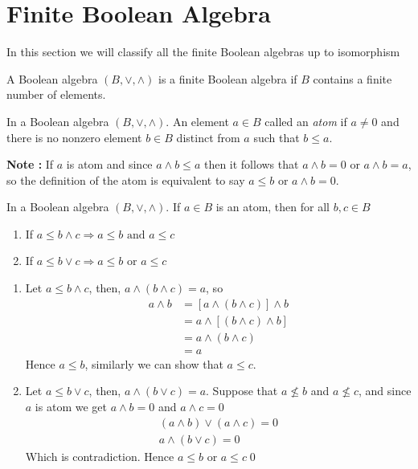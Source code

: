 \section{Finite Boolean Algebra}
In this section we will classify all the finite Boolean algebras up to isomorphism

\begin{mydef}
    A Boolean algebra \((B,\vee,\wedge)\) is a finite Boolean algebra if \(B\) contains a finite number of elements.
\end{mydef}

\begin{mydef}
    In a Boolean algebra \((B,\vee,\wedge)\). An element \(a\in B\) called an \textit{atom} if \(a\neq0\) and there is no nonzero element \(b\in B\) distinct from \(a\) such that \(b\leq a\).
\end{mydef}

\noindent
\textbf{Note : }If \(a\) is atom and since \(a\wedge b\leq a\) then it follows that \(a\wedge b=0\) or \(a\wedge b=a\), so the definition of the atom is equivalent to say \(a\leq b\) or \(a\wedge b=0\).

\begin{lemma}
\label{my_atom}
    In a Boolean algebra \((B,\vee,\wedge)\). If \(a\in B\) is an atom, then for all \(b,c\in B\) 
    \begin{enumerate}
        \item[\normalfont{1.}] If \(a\leq b\wedge c\Longrightarrow a\leq b\text{ and } a\leq c\)

        \item[\normalfont{2.}] If \(a\leq b\vee c\Longrightarrow a\leq b\text{ or } a\leq c\)
    \end{enumerate}
\end{lemma}

\begin{myproof}
\noindent
    \begin{enumerate}
        \item Let \(a\leq b\wedge c\), then, \(a\wedge(b\wedge c)=a\), so
        \begin{align*}
            a\wedge b&=[a\wedge(b\wedge c)]\wedge b\\
            &=a\wedge[(b\wedge c)\wedge b]\\
            &=a\wedge(b\wedge c)\\
            &=a
        \end{align*}
        Hence \(a\leq b\), similarly we can show that \(a\leq c\).

        \item Let \(a\leq b\vee c\), then, \(a\wedge(b\vee c)=a\). Suppose that \(a\nleq b\) and \(a\nleq c\), and since \(a\) is atom we get \(a\wedge b=0\) and \(a\wedge c=0\)
        \begin{gather*}
        (a\wedge b)\vee(a\wedge c)=0\\
        a\wedge(b\vee c)=0
        \end{gather*}
        Which is contradiction. Hence \(a\leq b\) or \(a\leq c\)\qed
    \end{enumerate}
\end{myproof}

